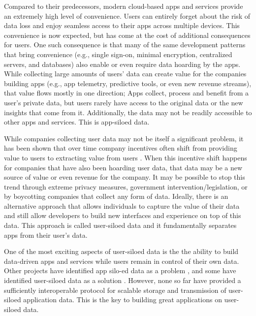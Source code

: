 \documentclass{textile}
\begin{document}
Compared to their predecessors, modern cloud-based apps and services provide an extremely high level of convenience. Users can entirely forget about the risk of data loss and enjoy seamless access to their apps across multiple devices. This convenience is now expected, but has come at the cost of additional consequences for users. One such consequence is that many of the same development patterns that bring convenience (e.g., single sign-on, minimal encryption, centralized servers, and databases) also enable or even require data hoarding by the apps. While collecting large amounts of users' data can create value for the companies building apps (e.g., app telemetry, predictive tools, or even new revenue streams), that value flows mostly in one direction; Apps collect, process and benefit from a user's private data, but users rarely have access to the original data or the new insights that come from it. Additionally,  the data may not be readily accessible to other apps and services. This is app-siloed data.

While companies collecting user data may not be itself a significant problem, it has been shown that over time company incentives often shift from providing value to users to extracting value from users \cite{dixonWhyDecentralizationMatters2018}. When this incentive shift happens for companies that have also been hoarding user data, that data may be a new source of value or even revenue for the company. It may be possible to stop this trend through extreme privacy measures, government intervention/legislation, or by boycotting companies that collect any form of data. Ideally, there is an alternative approach that allows individuals to capture the value of their data and still allow developers to build new interfaces and experience on top of this data. This approach is called user-siloed data and it fundamentally separates apps from their user's data.

One of the most exciting aspects of user-siloed data is the the ability to build data-driven apps and services while users remain in control of their own data. Other projects have identified app silo-ed data as a problem \cite{bernersLee_readwrite_2013,de_montjoye_trusted_2012}, and some have identified user-siloed data as a solution \cite{sambraSolidPlatformDecentralized2016}. However, none so far have provided a sufficiently interoperable protocol for scalable storage and transmission of user-siloed application data. This is the key to building great applications on user-siloed data.
\end{document}
